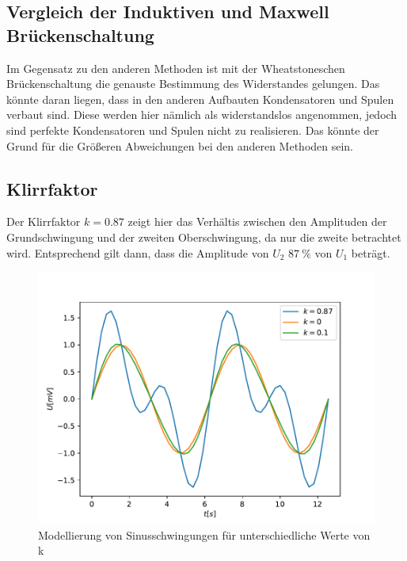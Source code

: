     \subsection{Vergleich der Induktiven und Maxwell Brückenschaltung}
    Im Gegensatz zu den anderen Methoden ist mit der Wheatstoneschen Brückenschaltung die genauste Bestimmung des Widerstandes gelungen.
    Das könnte daran liegen, dass in den anderen Aufbauten Kondensatoren und Spulen verbaut sind. 
    Diese werden hier nämlich als widerstandslos angenommen, jedoch sind perfekte Kondensatoren und Spulen nicht zu realisieren.
    Das könnte der Grund für die Größeren Abweichungen bei den anderen Methoden sein.

    \subsection{Klirrfaktor}
    Der Klirrfaktor $k=0.87$ zeigt hier das Verhältis zwischen den Amplituden der Grundschwingung und der zweiten Oberschwingung,
    da nur die zweite betrachtet wird.
    Entsprechend gilt dann, dass die Amplitude von $U_2$ $\qty{87}{\percent}$ von $U_1$ beträgt.

    \begin{figure}
        \centering
        \includegraphics{./Klirr_Model.pdf}
        \caption{Modellierung von Sinusschwingungen für unterschiedliche Werte von k}
        \label{fig:klirr_mod}
    \end{figure}

